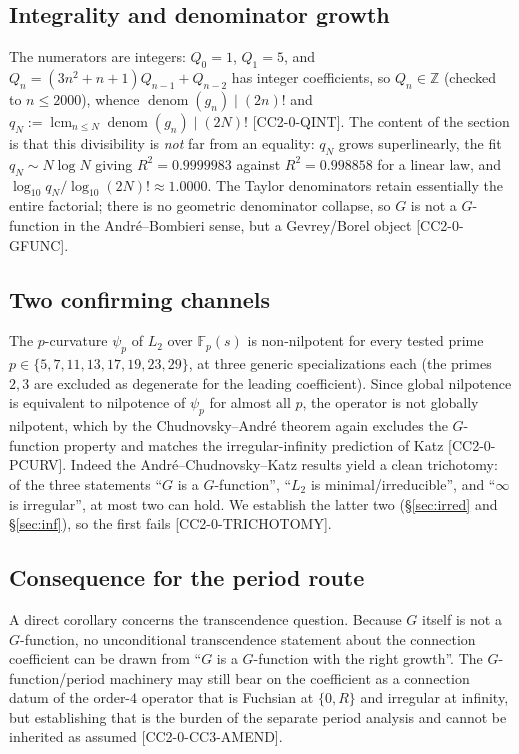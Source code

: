 \documentclass[11pt,reqno]{amsart}
\theoremstyle{plain}
\theoremstyle{definition}
\theoremstyle{remark}
\newcommand{\Z}{\mathbb{Z}}
\newcommand{\Fp}{\mathbb{F}_{p}}
\newcommand{\Ltwo}{L_{2}}
\newcommand{\claim}[1]{\textsf{\small[#1]}}
\begin{document}
\subsection{Integrality and denominator growth}
The numerators are integers: $Q_{0}=1$, $Q_{1}=5$, and
$Q_{n}=(3n^{2}+n+1)Q_{n-1}+Q_{n-2}$ has integer coefficients, so $Q_{n}\in\Z$
(checked to $n\le2000$), whence $\operatorname{denom}(g_{n})\mid(2n)!$ and
$q_{N}:=\operatorname{lcm}_{n\le N}\operatorname{denom}(g_{n})\mid(2N)!$
\claim{CC2-0-QINT}. The content of the section is that this divisibility is
\emph{not} far from an equality: $q_{N}$ grows superlinearly, the fit
$q_{N}\sim N\log N$ giving $R^{2}=0.9999983$ against $R^{2}=0.998858$ for a
linear law, and $\log_{10}q_{N}/\log_{10}(2N)!\approx1.0000$. The Taylor
denominators retain essentially the entire factorial; there is no geometric
denominator collapse, so $G$ is not a $G$-function in the
Andr\'e--Bombieri sense, but a Gevrey/Borel object \claim{CC2-0-GFUNC}.

\subsection{Two confirming channels}
The $p$-curvature $\psi_{p}$ of $\Ltwo$ over $\Fp(s)$ is non-nilpotent for
every tested prime $p\in\{5,7,11,13,17,19,23,29\}$, at three generic
specializations each (the primes $2,3$ are excluded as degenerate for the
leading coefficient). Since global nilpotence is equivalent to nilpotence of
$\psi_{p}$ for almost all $p$, the operator is not globally nilpotent, which by
the Chudnovsky--Andr\'e theorem again excludes the $G$-function property and
matches the irregular-infinity prediction of Katz \claim{CC2-0-PCURV}. Indeed
the Andr\'e--Chudnovsky--Katz results yield a clean trichotomy: of the three
statements ``$G$ is a $G$-function'', ``$\Ltwo$ is minimal/irreducible'', and
``$\infty$ is irregular'', at most two can hold. We establish the latter two
(\S\ref{sec:irred} and \S\ref{sec:inf}), so the first fails
\claim{CC2-0-TRICHOTOMY}.

\subsection{Consequence for the period route}
A direct corollary concerns the transcendence question. Because $G$ itself is
not a $G$-function, no unconditional transcendence statement about the
connection coefficient can be drawn from ``$G$ is a $G$-function with the right
growth''. The $G$-function/period machinery may still bear on the coefficient
as a connection datum of the order-$4$ operator that is Fuchsian at $\{0,R\}$
and irregular at infinity, but establishing that is the burden of the separate
period analysis and cannot be inherited as assumed \claim{CC2-0-CC3-AMEND}.
\end{document}
